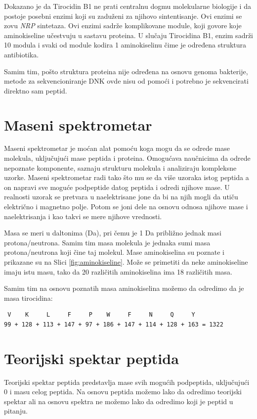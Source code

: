 \documentclass[12pt,oneside]{memoir}
\begin{document}
Dokazano je da Tirocidin B1 ne prati centralnu dogmu molekularne biologije i da postoje posebni enzimi koji su zaduženi za njihovo sintentisanje. Ovi enzimi se zovu \emph{NRP} sintetaza. Ovi enzimi sadrže komplikovane module, koji govore koje aminokiseline učestvuju u sastavu proteina. U slučaju Tirocidina B1, enzim sadrži 10 modula i svaki od module kodira 1 aminokiselinu čime je određena struktura antibiotika.

Samim tim, pošto struktura proteina nije određena na osnovu genoma bakterije, metode za sekvencioniranje DNK ovde nisu od pomoći i potrebno je sekvencirati direktno sam peptid.

\section{Maseni spektrometar}
Maseni spektrometar \cite{spectrometer} je moćan alat pomoću koga mogu da se odrede mase molekula, uključujući mase peptida i proteina. Omogućava naučnicima da odrede nepoznate komponente, saznaju strukturu molekula i analiziraju kompleksne uzorke. Maseni spektrometar radi tako što mu se da više uzoraka istog peptida a on napravi sve moguće podpeptide datog peptida i odredi njihove mase. U realnosti uzorak se pretvara u naelektrisane jone da bi na njih mogli da utiču električno i magnetno polje. Potom se joni dele na osnovu odnosa njihove mase i naelektrisanja i kao takvi se mere njihove vrednosti.

Masa se meri u daltonima (Da), pri čemu je 1 Da približno jednak masi protona/neutrona. Samim tim masa molekula je jednaka sumi masa protona/neutrona koji čine taj molekul. Mase aminokiselina su poznate i prikazane su na Slici \ref{fig:aminokiseline}. Može se primetiti da neke aminokiseline imaju istu masu, tako da 20 različitih aminokiselina ima 18 različitih masa.

Samim tim na osnovu poznatih masa aminokiselina možemo da odredimo da je masa tirocidina:
\begin{verbatim}
 V    K     L     F     P    W     F     N     Q     Y     
99 + 128 + 113 + 147 + 97 + 186 + 147 + 114 + 128 + 163 = 1322
\end{verbatim}

\section{Teorijski spektar peptida}
Teorijski spektar peptida predstavlja mase svih mogućih podpeptida, uključujući 0 i masu celog peptida. Na osnovu peptida možemo lako da odredimo teorijski spektar ali na osnovu spektra ne možemo lako da odredimo koji je peptid u pitanju.
\end{document}
